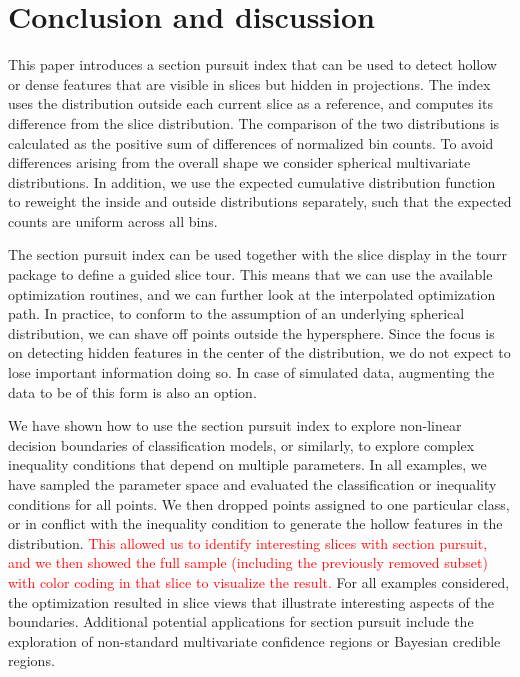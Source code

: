 \documentclass[]{interact}
\theoremstyle{plain}%
\theoremstyle{definition}
\theoremstyle{remark}
\begin{document}
\hypertarget{conclusion-and-discussion}{%
\section{Conclusion and discussion}\label{conclusion-and-discussion}}

This paper introduces a section pursuit index that can be used to detect
hollow or dense features that are visible in slices but hidden in
projections. The index uses the distribution outside each current slice
as a reference, and computes its difference from the slice distribution.
The comparison of the two distributions is calculated as the positive
sum of differences of normalized bin counts. To avoid differences
arising from the overall shape we consider spherical multivariate
distributions. In addition, we use the expected cumulative distribution
function to reweight the inside and outside distributions separately,
such that the expected counts are uniform across all bins.

The section pursuit index can be used together with the slice display in
the tourr package to define a guided slice tour. This means that we can
use the available optimization routines, and we can further look at the
interpolated optimization path. In practice, to conform to the
assumption of an underlying spherical distribution, we can shave off
points outside the hypersphere. Since the focus is on detecting hidden
features in the center of the distribution, we do not expect to lose
important information doing so. In case of simulated data, augmenting
the data to be of this form is also an option.

We have shown how to use the section pursuit index to explore non-linear
decision boundaries of classification models, or similarly, to explore
complex inequality conditions that depend on multiple parameters. In all
examples, we have sampled the parameter space and evaluated the
classification or inequality conditions for all points. We then dropped
points assigned to one particular class, or in conflict with the
inequality condition to generate the hollow features in the
distribution.
\textcolor{red}{This allowed us to identify interesting slices with section pursuit, and we then showed the full sample (including the previously removed subset) with color coding in that slice to visualize the result.}
For all examples considered, the optimization resulted in slice views
that illustrate interesting aspects of the boundaries. Additional
potential applications for section pursuit include the exploration of
non-standard multivariate confidence regions or Bayesian credible
regions.
\end{document}
